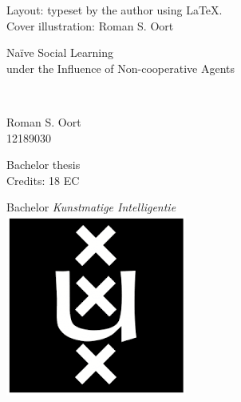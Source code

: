 \documentclass[a4paper, 12pt]{report}
\newcommand{\theTitle}{Na\"ive Social Learning \\under the Influence of Non-cooperative Agents}
\newcommand{\theSubTitle}{}
\newcommand{\theAuthor}{Roman S. Oort}
\newcommand{\theStudentID}{12189030}
\begin{document}
    \restoregeometry
    
\newpage

\thispagestyle{empty}
\vspace*{0.8\textheight}
\noindent
Layout: typeset by the author using \LaTeX. \\
Cover illustration: Roman S. Oort 
\restoregeometry

\newpage
\thispagestyle{empty}
\begin{center}

\vspace{2.5cm}


\begin{Huge}
\theTitle
\end{Huge} \\

\vspace{0.5 cm}

\begin{Large}
\theSubTitle
\end{Large}

\vspace{1.5cm}

\theAuthor\\
\theStudentID

\vspace{1.5cm}

Bachelor thesis\\
Credits: 18 EC

\vspace{0.5cm}

Bachelor \textit{Kunstmatige Intelligentie} \\
\vspace{0.25cm}
\includegraphics[width=0.075\paperwidth]{ThesisKI/UvAThesisLayout/uva_logo.png} \\
\vspace{0.1cm}


\end{center}
\end{document}
